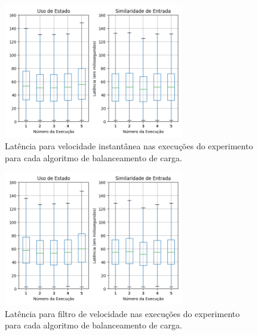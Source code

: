 

\begin{figure}[ht]
\centering
 \includegraphics[width=0.7\textwidth]{figuras/graphics/boxplot_agg_vf.png}
 \caption{Latência para velocidade instantânea nas execuções do experimento para cada algoritmo de balanceamento de carga.}
 \label{fig:boxplot_vf_agg_1}
\end{figure}


\begin{figure}[ht]
  \centering
\includegraphics[width=0.7\textwidth]{figuras/graphics/boxplot_agg_vi.png}
\caption{Latência para filtro de velocidade nas execuções do experimento para cada algoritmo de balanceamento de carga.}
\label{fig:boxplot_vi_agg_1}
\end{figure}

